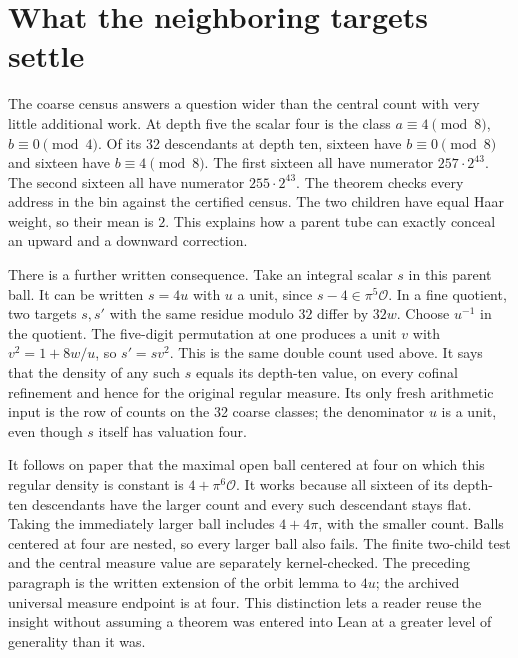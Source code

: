 \documentclass[12pt,letterpaper]{article}
\newcommand{\code}[1]{\texttt{\detokenize{#1}}}
\begin{document}
\section{What the neighboring targets settle}
The coarse census answers a question wider than the central count with very little additional work. At depth five the scalar four is the class $a\equiv4\pmod8$, $b\equiv0\pmod4$. Of its 32 descendants at depth ten, sixteen have $b\equiv0\pmod8$ and sixteen have $b\equiv4\pmod8$. The first sixteen all have numerator $257\cdot2^{43}$. The second sixteen all have numerator $255\cdot2^{43}$. The theorem \code{RamPrecision.coarse_children} checks every address in the bin against the certified census. The two children have equal Haar weight, so their mean is $2$. This explains how a parent tube can exactly conceal an upward and a downward correction.
\par
There is a further written consequence. Take an integral scalar $s$ in this parent ball. It can be written $s=4u$ with $u$ a unit, since $s-4\in\pi^5\mathcal O$. In a fine quotient, two targets $s,s'$ with the same residue modulo $32$ differ by $32w$. Choose $u^{-1}$ in the quotient. The five-digit permutation at one produces a unit $v$ with $v^2=1+8w/u$, so $s'=sv^2$. This is the same double count used above. It says that the density of any such $s$ equals its depth-ten value, on every cofinal refinement and hence for the original regular measure. Its only fresh arithmetic input is the row of counts on the 32 coarse classes; the denominator $u$ is a unit, even though $s$ itself has valuation four.
\par
It follows on paper that the maximal open ball centered at four on which this regular density is constant is $4+\pi^6\mathcal O$. It works because all sixteen of its depth-ten descendants have the larger count and every such descendant stays flat. Taking the immediately larger ball includes $4+4\pi$, with the smaller count. Balls centered at four are nested, so every larger ball also fails. The finite two-child test and the central measure value are separately kernel-checked. The preceding paragraph is the written extension of the orbit lemma to $4u$; the archived universal measure endpoint is at four. This distinction lets a reader reuse the insight without assuming a theorem was entered into Lean at a greater level of generality than it was.
\end{document}
